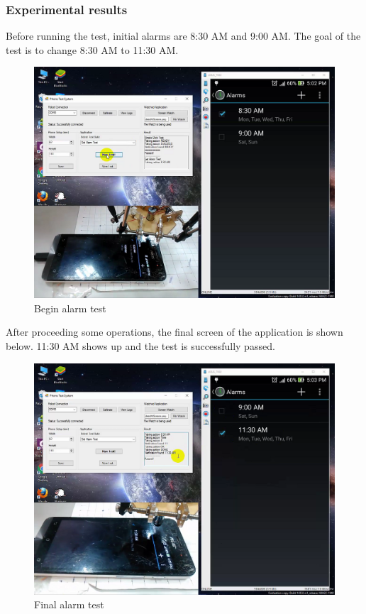 \subsubsection{Experimental results}
Before running the test, initial alarms are 8:30 AM and 9:00 AM. The goal of the test is to change 8:30 AM to 11:30 AM.

	\begin{figure}[H]
		\centering
		\includegraphics[scale=0.5]{Chapters/Fig/alarm_start.png}
		\caption{Begin alarm test}
		\label{fig:alarm_start}
	\end{figure}

After proceeding some operations, the final screen of the application is shown below. 11:30 AM shows up and the test is successfully passed.

	\begin{figure}[H]
		\centering
		\includegraphics[scale=0.5]{Chapters/Fig/alarm_final.png}
		\caption{Final alarm test}
		\label{fig:alarm_final}
	\end{figure}

